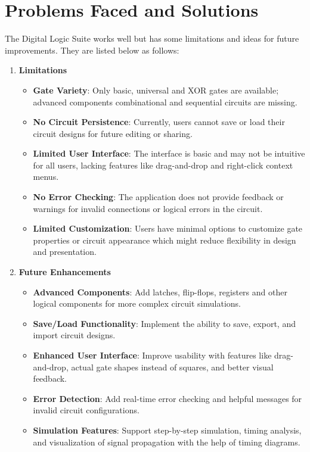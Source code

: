 \section{Problems Faced and Solutions}
The Digital Logic Suite works well but has some limitations and ideas for future improvements. They are listed below as follows:

\begin{enumerate}
    \item \textbf{Limitations}
          \begin{itemize}
              \item \textbf{Gate Variety}: Only basic, universal and XOR gates are available; advanced components combinational and sequential circuits are missing.
              \item \textbf{No Circuit Persistence}: Currently, users cannot save or load their circuit designs for future editing or sharing.
              \item \textbf{Limited User Interface}: The interface is basic and may not be intuitive for all users, lacking features like drag-and-drop and right-click context menus.
              \item \textbf{No Error Checking}: The application does not provide feedback or warnings for invalid connections or logical errors in the circuit.
              \item \textbf{Limited Customization}: Users have minimal options to customize gate properties or circuit appearance which might reduce flexibility in design and presentation.
          \end{itemize}
    \item \textbf{Future Enhancements}
          \begin{itemize}
              \item \textbf{Advanced Components}: Add latches, flip-flops, registers and other logical components for more complex circuit simulations.
              \item \textbf{Save/Load Functionality}: Implement the ability to save, export, and import circuit designs.
              \item \textbf{Enhanced User Interface}: Improve usability with features like drag-and-drop, actual gate shapes instead of squares, and better visual feedback.
              \item \textbf{Error Detection}: Add real-time error checking and helpful messages for invalid circuit configurations.
              \item \textbf{Simulation Features}: Support step-by-step simulation, timing analysis, and visualization of signal propagation with the help of timing diagrams.
          \end{itemize}
\end{enumerate}

\clearpage
